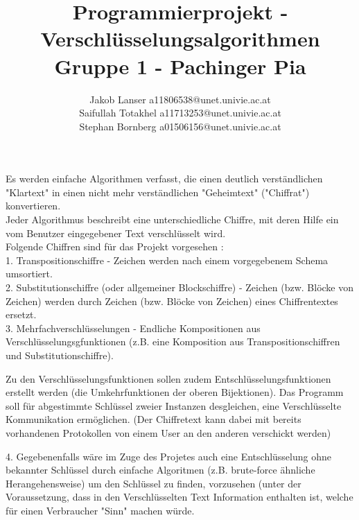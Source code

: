 \documentclass{article}
\title{Programmierprojekt - Verschlüsselungsalgorithmen\\Gruppe 1 -  Pachinger Pia}
\author{Jakob Lanser a11806538@unet.univie.ac.at\\Saifullah Totakhel a11713253@unet.univie.ac.at\\Stephan Bornberg a01506156@unet.univie.ac.at}
\begin{document}
\maketitle

Es werden einfache Algorithmen verfasst, die einen deutlich verständlichen "Klartext" in einen nicht mehr verständlichen "Geheimtext" ("Chiffrat") konvertieren.\\
Jeder Algorithmus beschreibt eine unterschiedliche Chiffre, mit deren Hilfe ein vom Benutzer eingegebener Text verschlüsselt wird.\\
Folgende Chiffren sind für das Projekt vorgesehen :\\
1. Transpositionschiffre - Zeichen werden nach einem vorgegebenem Schema umsortiert.\\
2. Substitutionschiffre (oder allgemeiner Blockschiffre) - Zeichen (bzw. Blöcke von Zeichen) werden durch Zeichen (bzw. Blöcke von Zeichen) eines Chiffrentextes ersetzt.\\
3. Mehrfachverschlüsselungen - Endliche Kompositionen aus Verschlüsselungsgfunktionen (z.B. eine Komposition aus Transpositionschiffren und Substitutionschiffre).

Zu den Verschlüsselungsfunktionen sollen zudem Entschlüsselungsfunktionen erstellt werden (die Umkehrfunktionen der oberen Bijektionen). Das Programm soll für abgestimmte Schlüssel zweier Instanzen desgleichen, eine Verschlüsselte Kommunikation ermöglichen. (Der Chiffretext kann dabei mit bereits vorhandenen Protokollen von einem User an den anderen verschickt werden)

4. Gegebenenfalls wäre im Zuge des Projetes auch eine Entschlüsselung ohne bekannter Schlüssel durch einfache Algoritmen (z.B. brute-force ähnliche Herangehensweise) um den Schlüssel zu finden, vorzusehen (unter der Voraussetzung, dass in den Verschlüsselten Text Information enthalten ist, welche für einen Verbraucher "Sinn" machen würde. 
\end{document}

